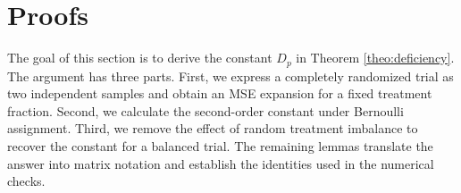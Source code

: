 \documentclass{article}
\newcommand{\gz}[1]{\ifcsname gz:#1\endcsname\csname gz:#1\endcsname\else\errmessage{Missing generated value #1}\fi}
\theoremstyle{plain}
\theoremstyle{definition}
\theoremstyle{remark}
\begin{document}






\appendix

\section{Proofs}
\label{sec:proofs}

The goal of this section is to derive the constant $D_p$ in Theorem
\ref{theo:deficiency}. The argument has three parts. First, we express a
completely randomized trial as two independent samples and obtain an
MSE expansion for a fixed treatment fraction. Second, we calculate the
second-order constant under Bernoulli assignment. Third, we remove the
effect of random treatment imbalance to recover the constant for a
balanced trial. The remaining lemmas translate the answer into matrix
notation and establish the identities used in the numerical checks.
\end{document}
